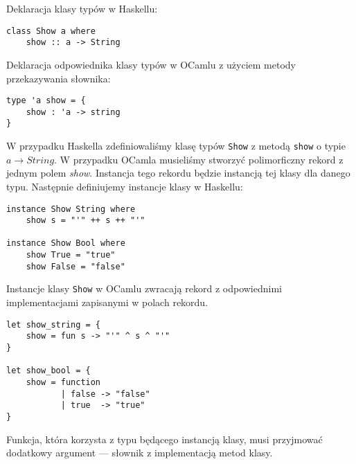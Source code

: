 \documentclass[declaration,shortabstract]{iithesis}
\begin{document}
Deklaracja klasy typów w Haskellu:
\begin{lstlisting}[frame=lines]
class Show a where 
    show :: a -> String
\end{lstlisting}

Deklaracja odpowiednika klasy typów w OCamlu z
użyciem metody przekazywania słownika:
\begin{lstlisting}[frame=lines]
type 'a show = { 
    show : 'a -> string 
} 
\end{lstlisting}

W przypadku Haskella zdefiniowaliśmy klasę typów 
\texttt{Show} z metodą 
\texttt{show} o typie $a \rightarrow String$. W przypadku OCamla musieliśmy 
stworzyć polimorficzny rekord z jednym 
polem \textit{show}. Instancja tego rekordu będzie instancją tej klasy 
dla danego typu. Następnie definiujemy instancje klasy w Haskellu:
\begin{lstlisting}[frame=lines]
instance Show String where
    show s = "'" ++ s ++ "'"

instance Show Bool where
    show True = "true"
    show False = "false" 
\end{lstlisting}
Instancje klasy \texttt{Show} w OCamlu zwracają 
rekord z odpowiednimi implementacjami zapisanymi w polach rekordu. 

\begin{lstlisting}[frame=lines]
let show_string = {
    show = fun s -> "'" ^ s ^ "'"
}

let show_bool = {
    show = function 
           | false -> "false"
           | true  -> "true"
}
\end{lstlisting}

Funkcja, która korzysta z typu będącego instancją klasy, musi przyjmować 
dodatkowy argument --- słownik z implementacją metod klasy. 
\end{document}
